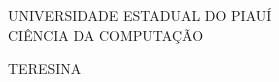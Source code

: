 \documentclass[
	12pt,				%
	openright,			%
	oneside,			%
	a4paper,			%
	chapter=TITLE,		%
	english,			%
	brazil,				%
	]{abntex2}
\renewcommand{\ABNTEXchapterfont}{\normalfont}
\begin{document}
\frenchspacing 


    \begin{center}
    {\ABNTEXchapterfont\large UNIVERSIDADE ESTADUAL DO PIAUÍ}\\
    {\ABNTEXchapterfont\large CIÊNCIA DA COMPUTAÇÃO}
    
    \vspace*{\fill}\vspace*{\fill}
    {\ABNTEXchapterfont\large \imprimirautor}  
    \vspace*{\fill}
   
    \vspace*{\fill}\vspace*{\fill}
    \begin{center}
    \ABNTEXchapterfont \bfseries \Large \imprimirtitulo
    \end{center}
    \vspace*{\fill}\vspace*{\fill}
   
  
   \end{center}  

      
    \begin{center}
    \vspace*{0.5cm}
    {\ABNTEXchapterfont\large TERESINA}
    \par
    {\ABNTEXchapterfont\large \imprimirdata}
    \vspace*{1cm}
    \end{center}
\end{document}
